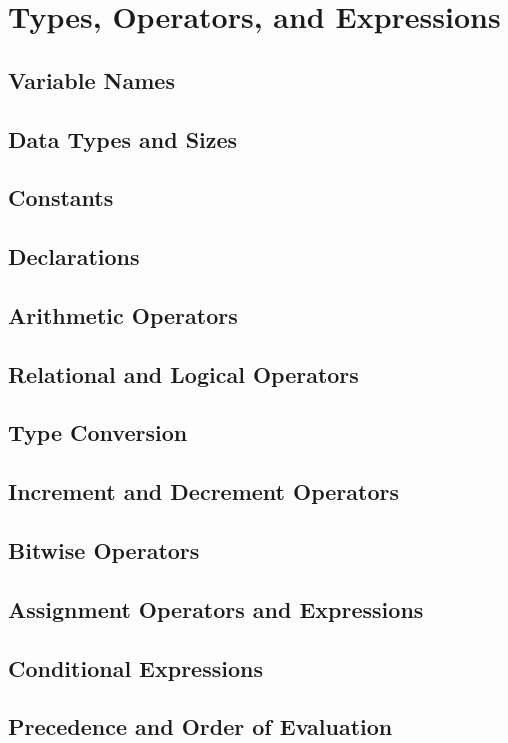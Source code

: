 \section{Types, Operators, and Expressions}
	\subsection{Variable Names}
	\subsection{Data Types and Sizes}
	\subsection{Constants}
	\subsection{Declarations}
	\subsection{Arithmetic Operators}
	\subsection{Relational and Logical Operators}
	\subsection{Type Conversion}
	\subsection{Increment and Decrement Operators}
	\subsection{Bitwise Operators}
	\subsection{Assignment Operators and Expressions}
	\subsection{Conditional Expressions}
	\subsection{Precedence and Order of Evaluation}
